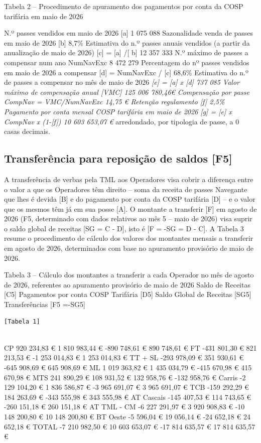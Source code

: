 \documentclass[
  a4paper,
]{article}
\begin{document}
Tabela 2 -- Procedimento de apuramento dos pagamentos por conta da COSP
tarifária em maio de 2026

N.º passes vendidos em maio de 2026 {[}a{]} 1 075 088 Sazonalidade venda
de passes em maio de 2026 {[}b{]} 8,7\% Estimativa do n.º passes anuais
vendidos (a partir da anualização de maio de 2026) {[}c{]} = {[}a{]}
/{[} b{]} 12 357 333 N.º máximo de passes a compensar num ano NumNavExc
8 472 279 Percentagem do nº passes vendidos em maio de 2026 a compensar
{[}d{]} = NumNavExc / {[}c{]} 68,6\% Estimativa do n.º de passes a
compensar no mês de maio de 2026\emph{ {[}e{]} = {[}a{]} x {[}d{]} 737
085 Valor máximo de compensação anual {[}VMC{]} 125 006 780,46€
Compensação por passe CompNav = VMC/NumNavExc 14,75 € Retenção
regulamento {[}f{]} 2,5\% Pagamento por conta mensal COSP tarifária em
maio de 2026 {[}g{]} = {[}e{]} x CompNav x (1-{[}f{]}) 10 603 653,07 € }
arredondado, por tipologia de passe, a 0 casas decimais.

\subsection{Transferência para reposição de saldos
{[}F5{]}}\label{transferuxeancia-para-reposiuxe7uxe3o-de-saldos-f5}

A transferência de verbas pela TML aos Operadores visa cobrir a
diferença entre o valor a que os Operadores têm direito -- soma da
receita de passes Navegante que lhes é devida {[}B{]} e do pagamento por
conta da COSP tarifária {[}D{]} -- e o valor que os mesmos têm já em sua
posse {[}A{]}. O montante a transferir {[}F{]} em agosto de 2026 (F5,
determinado com dados relativos ao mês 5 -- maio de 2026) visa suprir o
saldo global de receitas {[}SG = C - D{]}, isto é {[}F = -SG = D - C{]}.
A Tabela 3 resume o procedimento de cálculo dos valores dos montantes
mensais a transferir em agosto de 2026, determinados com base no
apuramento provisório de maio de 2026.

Tabela 3 -- Cálculo dos montantes a transferir a cada Operador no mês de
agosto de 2026, referentes ao apuramento provisório de maio de 2026
Saldo de Receitas {[}C5{]} Pagamentos por conta COSP Tarifária {[}D5{]}
Saldo Global de Receitas {[}SG5{]} Transferências {[}F5 =-SG5{]}

\begin{verbatim}
[Tabela 1]
    
\end{verbatim}

CP 920 234,83 € 1 810 983,44 € -890 748,61 € 890 748,61 € FT -431 801,30
€ 821 213,53 € -1 253 014,83 € 1 253 014,83 € TT + SL -293 978,09 € 351
930,61 € -645 908,69 € 645 908,69 € ML 1 019 363,82 € 1 435 034,79 €
-415 670,98 € 415 670,98 € MTS 241 890,29 € 108 931,52 € 132 958,76 €
-132 958,76 € Carris -2 129 104,20 € 1 836 586,87 € -3 965 691,07 € 3
965 691,07 € TCB -159 292,29 € 184 263,69 € -343 555,98 € 343 555,98 €
AT Cascais -145 407,53 € 114 743,65 € -260 151,18 € 260 151,18 € AT TML
- CM -6 227 291,97 € 3 920 908,83 € -10 148 200,80 € 10 148 200,80 € BT
Oeste -5 596,04 € 19 056,14 € -24 652,18 € 24 652,18 € TOTAL -7 210
982,50 € 10 603 653,07 € -17 814 635,57 € 17 814 635,57 €
\end{document}
